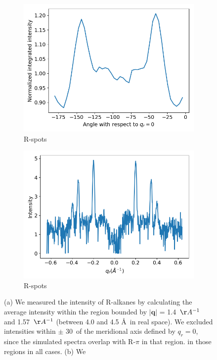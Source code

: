 \documentclass[journal=jpcbfk,manuscript=article]{achemso}
\begin{document}
\begin{figure}[!htb]
\begin{subfigure}{0.45\linewidth}
  \includegraphics[width=\textwidth]{angular_integration.png}
  \caption{R-spots}\label{fig:rspots}
  \end{subfigure}
  \begin{subfigure}{0.45\linewidth}
  \centering
  \includegraphics[width=\textwidth]{saxs_xsection.png}
  \caption{R-spots}\label{fig:saxs_xsection}
  \end{subfigure}
  \caption{(a) We measured the intensity of R-alkanes by calculating the average 
  intensity within the region bounded by $|\mathbf{q}|$ = 1.4~$\AA^{-1}$ and 
  1.57~$\AA^{-1}$ (between 4.0 and 4.5 \AA~in real space). We excluded intensities
  within $\pm$ 30\degree~of the meridional axis defined by $q_r=0$, since the 
  simulated spectra overlap with R-$\pi$ in that region. in those regions in all cases. (b) We
}
\end{figure}
\end{document}
